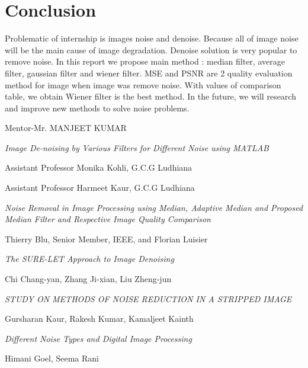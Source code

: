 \chapter{Conclusion}
Problematic of internship is images noise and denoise. Because all of image noise will be the main cause of image degradation. Denoise solution is very popular to remove noise. In this report we propose main method : median filter, average filter, gaussian filter and wiener filter. MSE and PSNR are 2 quality evaluation method for image when image was remove noise. With values of comparison table, we obtain Wiener filter is the best method. In the future, we will research and improve new methods to solve noise problems.



\begin{thebibliography}{9}
	
	
	

    Mentor-Mr. MANJEET KUMAR

    	
    	\textit{Image De-noising by
    	Various Filters for
    	Different Noise using
    	MATLAB }

Assistant Professor Monika Kohli, G.C.G Ludhiana

Assistant Professor Harmeet Kaur, G.C.G Ludhiana

\textit{Noise Removal in Image Processing using Median, Adaptive Median and Proposed Median Filter and Respective Image Quality Comparison}

	Thierry Blu, Senior Member, IEEE, and Florian Luisier
	
	\textit{The SURE-LET Approach to Image Denoising}





Chi Chang-yan, Zhang Ji-xian, Liu Zheng-jun

\textit{STUDY ON METHODS OF NOISE REDUCTION IN A STRIPPED IMAGE}

Gursharan Kaur, Rakesh Kumar, Kamaljeet Kainth

\textit{Different Noise Types and Digital Image Processing}

Himani Goel, Seema Rani


\end{thebibliography}
